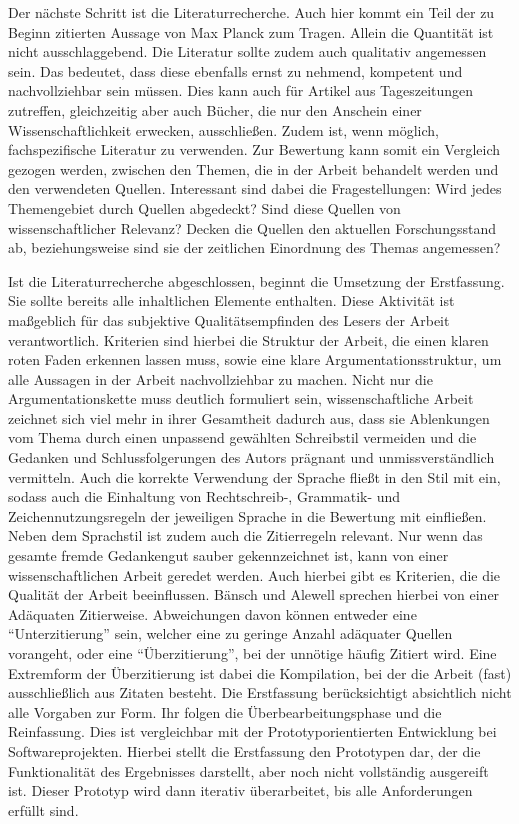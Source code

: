 Der nächste Schritt ist die Literaturrecherche. Auch hier kommt ein Teil der zu Beginn zitierten Aussage von Max Planck zum Tragen. Allein die Quantität ist nicht ausschlaggebend. Die Literatur sollte zudem auch qualitativ angemessen sein. Das bedeutet, dass diese ebenfalls ernst zu nehmend, kompetent und nachvollziehbar sein müssen. Dies kann auch für Artikel aus Tageszeitungen zutreffen, gleichzeitig aber auch Bücher, die nur den Anschein einer Wissenschaftlichkeit erwecken, ausschließen. Zudem ist, wenn möglich, fachspezifische Literatur zu verwenden.\cite[Vgl.][S. 7 f.]{Baensch:2013} Zur Bewertung kann somit ein Vergleich gezogen werden, zwischen den Themen, die in der Arbeit behandelt werden und den verwendeten Quellen. Interessant sind dabei die Fragestellungen: Wird jedes Themengebiet durch Quellen abgedeckt? Sind diese Quellen von wissenschaftlicher Relevanz? Decken die Quellen den aktuellen Forschungsstand ab, beziehungsweise sind sie der zeitlichen Einordnung des Themas angemessen?

Ist die Literaturrecherche abgeschlossen, beginnt die Umsetzung der Erstfassung. Sie sollte bereits alle inhaltlichen Elemente enthalten. Diese Aktivität ist maßgeblich für das subjektive Qualitätsempfinden des Lesers der Arbeit verantwortlich. Kriterien sind hierbei die Struktur der Arbeit, die einen klaren roten Faden erkennen lassen muss, sowie eine klare Argumentationsstruktur, um alle Aussagen in der Arbeit nachvollziehbar zu machen.\cite[Vgl.][S. 59]{Baensch:2013}
Nicht nur die Argumentationskette muss deutlich formuliert sein, wissenschaftliche Arbeit zeichnet sich viel mehr in ihrer Gesamtheit dadurch aus, dass sie Ablenkungen vom Thema durch einen unpassend gewählten Schreibstil vermeiden und die Gedanken und Schlussfolgerungen des Autors prägnant und unmissverständlich vermitteln. Auch die korrekte Verwendung der Sprache fließt in den Stil mit ein, sodass auch die Einhaltung von Rechtschreib-, Grammatik- und Zeichennutzungsregeln der jeweiligen Sprache in die Bewertung mit einfließen.\cite[Vgl.][S. 25-27]{Baensch:2013} 
Neben dem Sprachstil ist zudem auch die Zitierregeln relevant. Nur wenn das gesamte fremde Gedankengut sauber gekennzeichnet ist, kann von einer wissenschaftlichen Arbeit geredet werden. Auch hierbei gibt es Kriterien, die die Qualität der Arbeit beeinflussen. Bänsch und Alewell sprechen hierbei von einer Adäquaten Zitierweise. Abweichungen davon können entweder eine \enquote{Unterzitierung} sein, welcher eine zu geringe Anzahl adäquater Quellen vorangeht, oder eine \enquote{Überzitierung}, bei der unnötige häufig Zitiert wird. Eine Extremform der Überzitierung ist dabei die Kompilation, bei der die Arbeit (fast) ausschließlich aus Zitaten besteht.\cite[Vgl.][S.11 f.]{Baensch:2013}
Die Erstfassung berücksichtigt absichtlich nicht alle Vorgaben zur Form. Ihr folgen die Überbearbeitungsphase und die Reinfassung. Dies ist vergleichbar mit der Prototyporientierten Entwicklung bei Softwareprojekten. Hierbei stellt die Erstfassung den Prototypen dar, der die Funktionalität des Ergebnisses darstellt, aber noch nicht vollständig ausgereift ist. Dieser Prototyp wird dann iterativ überarbeitet, bis alle Anforderungen erfüllt sind.\cite[Vgl.][S. 363]{Liggesmeyer:2009}

